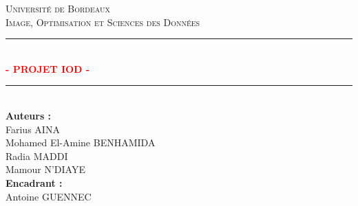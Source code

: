 \documentclass[a4paper, 12pt]{report} %
\newcommand{\HRule}{\rule{\linewidth}{0.5mm}}
\begin{document}
 

\everymath{\displaystyle}


\begin{titlepage}
\begin{center} %

\textsc{\huge Université de Bordeaux} \\[2cm]

\textsc{\large {Image, Optimisation et Sciences des Données}} \\[0.5cm] 

\HRule \\[0.6cm]
{\Huge\bfseries\textcolor{Red}{- PROJET IOD -}} \\[0.25cm]
\HRule \\[1.5cm]

\Large\textbf{Auteurs :} \\[0.5cm]
Farius \textsc{AINA} \\[0.5cm]
Mohamed El-Amine \textsc{BENHAMIDA} \\[0.5cm]
Radia \textsc{MADDI} \\[0.5cm]
Mamour \textsc{N'DIAYE} \\[2.5cm]

\Large\textbf{Encadrant :} \\[0.5cm]
Antoine \textsc{GUENNEC} \\[0.5cm]

\end{center}
\end{titlepage}


\setcounter{tocdepth}{1} 
\end{document}
